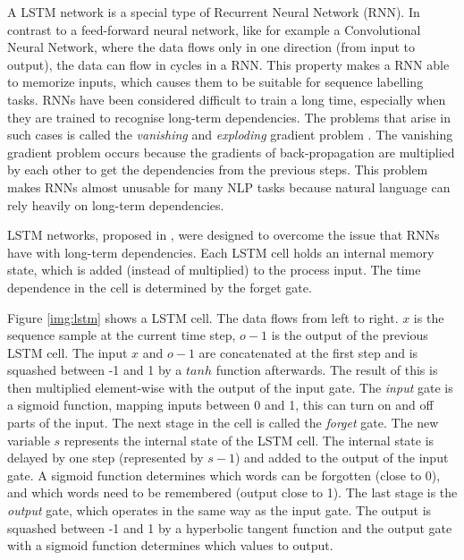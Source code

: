 \documentclass[12pt]{book}
\begin{document}
	A LSTM network is a special type of Recurrent Neural Network (RNN). In contrast to a feed-forward neural network, like for example a Convolutional Neural Network, where the data flows only in one direction (from input to output), the data can flow in cycles in a RNN. This property makes a RNN able to memorize inputs, which causes them to be suitable for sequence labelling tasks.
	RNNs have been considered difficult to train a long time, especially when they are trained to recognise long-term dependencies. The problems that arise in such cases is called the \textit{vanishing} and \textit{exploding} gradient problem \cite{lipton2015critical}. The vanishing gradient problem occurs because the gradients of back-propagation are multiplied by each other to get the dependencies from the previous steps. This problem makes RNNs almost unusable for many NLP tasks because natural language can rely heavily on long-term dependencies.
	
	LSTM networks, proposed in \cite{hochreiter1997long}, were designed to overcome the issue that RNNs have with long-term dependencies. Each LSTM cell holds an internal memory state, which is added (instead of multiplied) to the process input. The time dependence in the cell is determined by the forget gate.
	
	Figure \ref{img:lstm} shows a LSTM cell. The data flows from left to right. $x$ is the sequence sample at the current time step, $o-1$ is the output of the previous LSTM cell. The input $x$ and $o-1$ are concatenated at the first step and is squashed between -1 and 1 by a $tanh$ function afterwards. The result of this is then multiplied element-wise with the output of the input gate. The \textit{input} gate is a sigmoid function, mapping inputs between 0 and 1, this can turn on and off parts of the input. 
	The next stage in the cell is called the \textit{forget} gate. The new variable $s$ represents the internal state of the LSTM cell. The internal state is delayed by one step (represented by $s-1$) and added to the output of the input gate. A sigmoid function determines which words can be forgotten (close to 0), and which words need to be remembered (output close to 1).
	The last stage is the \textit{output} gate, which operates in the same way as the input gate. The output is squashed between -1 and 1 by a hyperbolic tangent function and the output gate with a sigmoid function determines which values to output.
	
\end{document}

